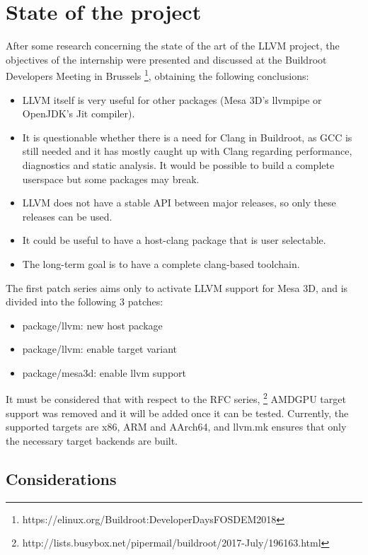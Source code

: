 \documentclass[12pt,a4paper,oneside]{article}
\begin{document}
\section*{State of the project}
After some research concerning the state of the art of the LLVM project, the objectives
of the internship were presented and discussed at the Buildroot Developers Meeting
in Brussels \footnote{https://elinux.org/Buildroot:DeveloperDaysFOSDEM2018}, obtaining
the following conclusions:
\begin{itemize}
  \item LLVM itself is very useful for other packages (Mesa 3D's llvmpipe or OpenJDK's
        Jit compiler).
  \item It is questionable whether there is a need for Clang in Buildroot, as GCC
        is still needed and it has mostly caught up with Clang regarding performance,
        diagnostics and static analysis. It would be possible to build a complete
        userspace but some packages may break.
  \item LLVM does not have a stable API between major releases, so only these releases
        can be used.
  \item It could be useful to have a host-clang package that is user selectable.
  \item The long-term goal is to have a complete clang-based toolchain.
\end{itemize}
The first patch series aims only to activate LLVM support for Mesa 3D, and is divided
into the following 3 patches:
\begin{itemize}
  \item package/llvm: new host package
  \item package/llvm: enable target variant
  \item package/mesa3d: enable llvm support
\end{itemize}
It must be considered that with respect to the RFC series,
\footnote{http://lists.busybox.net/pipermail/buildroot/2017-July/196163.html}
AMDGPU target support was removed and it will be added once it can be tested.
Currently, the supported targets are x86, ARM and AArch64, and llvm.mk ensures
that only the necessary target backends are built.

\subsection*{Considerations}
\end{document}
